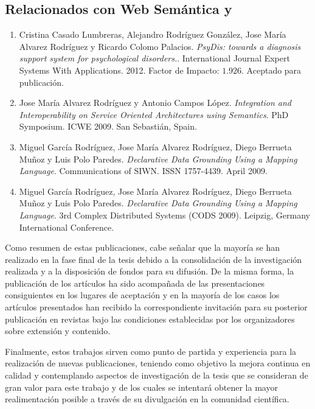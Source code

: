 \subsection{Relacionados con Web Semántica y \linkeddata}

\begin{enumerate}

\item Cristina Casado Lumbreras, Alejandro Rodríguez González, Jose María Alvarez Rodríguez y Ricardo Colomo Palacios. 
\textit{PsyDis: towards a diagnosis support system for psychological disorders.}. International Journal Expert Systems With Applications. 2012. 
Factor de Impacto: $1.926$. Aceptado para publicación.

\item Jose María Alvarez Rodríguez y Antonio Campos López. 
\textit{Integration and Interoperability on Service Oriented Architectures using Semantics}. PhD Symposium. ICWE 2009.
San Sebastián, Spain.

\item Miguel García Rodríguez, Jose María Alvarez Rodríguez, Diego Berrueta Muñoz y Luis Polo Paredes. 
\textit{Declarative Data Grounding Using a Mapping Language}. Communications of SIWN. ISSN 1757-4439. April 2009.


\item Miguel García Rodríguez, Jose María Alvarez Rodríguez, Diego Berrueta Muñoz y Luis Polo Paredes. 
\textit{Declarative Data Grounding Using a Mapping Language}. 3rd Complex Distributed Systems (CODS 2009). Leipzig, Germany International Conference.

\end{enumerate}

Como resumen de estas publicaciones, cabe señalar que la mayoría se han realizado en la fase final
de la tesis debido a la consolidación de la investigación realizada y a la disposición de fondos para su
difusión. De la misma forma, la publicación de los artículos ha sido acompañada de las presentaciones
consiguientes en los lugares de aceptación y en la mayoría de los casos los artículos presentados
han recibido la correspondiente invitación para su posterior publicación en revistas bajo las condiciones
establecidas por los organizadores sobre extensión y contenido.

Finalmente, estos trabajos sirven como punto de partida y experiencia para la realización de nuevas publicaciones, teniendo
como objetivo la mejora continua en calidad y contemplando aspectos de investigación de la tesis que se 
consideran de gran valor para este trabajo y de los cuales se intentará obtener la mayor realimentación posible a 
través de su divulgación en la comunidad científica.


